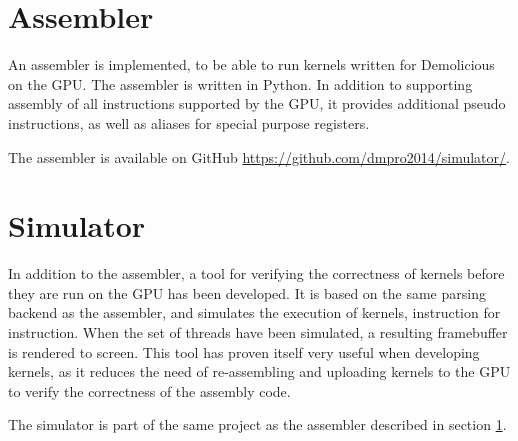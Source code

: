 \section{Assembler}
\label{sec:assembler}

An assembler is implemented, to be able to run kernels written for Demolicious on the GPU.
The assembler is written in Python.
In addition to supporting assembly of all instructions supported by the GPU,
it provides additional pseudo instructions, as well as aliases for special purpose registers.

The assembler is available on GitHub \url{https://github.com/dmpro2014/simulator/}.

\section{Simulator}
\label{sec:simulator}

In addition to the assembler,
a tool for verifying the correctness of kernels before they are run on the GPU has been developed.
It is based on the same parsing backend as the assembler, and simulates the execution of kernels, instruction for instruction.
When the set of threads have been simulated, a resulting framebuffer is rendered to screen.
This tool has proven itself very useful when developing kernels,
as it reduces the need of re-assembling and uploading kernels to the GPU to verify the correctness of the assembly code.

The simulator is part of the same project as the assembler described in section \ref{sec:assembler}.
